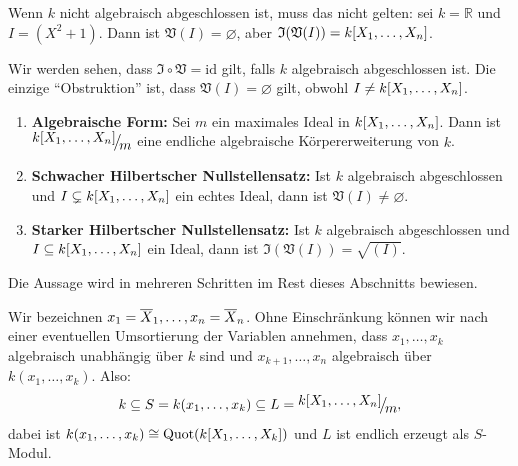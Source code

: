 \documentclass[a4paper,12pt]{scrbook}
\theoremstyle{blah}
\theoremstyle{stz}
\def\V{\mathfrak{V}}
\def\I{\mathfrak{I}}
\newcommand{\id}{\mathrm{id}}
\newcommand{\leer}{\ensuremath{\varnothing}}
\newcommand{\Quot}{\mathrm{Quot}}
\newcommand{\set}[1]{\ensuremath{\mathbb{#1}}}
\newcommand{\R}{\set{R}}
\def\Bar#1{\ensuremath\overline{#1}}
\newcommand{\Quotient}[2]{
  \raisebox{0.7ex}{\ensuremath{#1}}
  \ensuremath{\mkern-3mu}\big/\ensuremath{\mkern-3mu}
  \raisebox{-0.6ex}{\ensuremath{#2}}}
\newcommand{\polyx}[1][n]{\ensuremath%
  [X_{1},\dotsc,X_{#1}]}
\begin{document}
\begin{bsp*}
  Wenn $k$ nicht algebraisch abgeschlossen ist, muss das nicht gelten: sei $k=\R$ und $I=(X^2+1)$. Dann ist $\V(I)=\leer$, aber
  $\I(\V(I)) = k\polyx$.
\end{bsp*}

Wir werden sehen, dass $\I\circ\V=\id$ gilt, falls $k$ algebraisch abgeschlossen ist. Die einzige \enquote{Obstruktion} ist,
dass $\V(I)=\leer$ gilt, obwohl $I\neq k\polyx$.

\begin{satz}\label{satz2}\label{HNS}
  \begin{enumerate}
  \item {\bf Algebraische Form:}\label{satz2a} Sei $m$ ein maximales Ideal in $k\polyx$. Dann ist $\Quotient{k\polyx}{m}$ eine
    endliche algebraische Körpererweiterung von $k$.
  \item {\bf Schwacher Hilbertscher Nullstellensatz:}\label{satz2b} Ist $k$ algebraisch abgeschlossen und $I\subsetneq k\polyx$
    ein echtes Ideal, dann ist $\V(I)\neq\leer$.
  \item {\bf Starker Hilbertscher Nullstellensatz:}\label{satz2c} Ist $k$ algebraisch abgeschlossen und $I\subseteq k\polyx$ ein
    Ideal, dann ist $\I(\V(I))=\sqrt{(I)}$.
  \end{enumerate}
\end{satz}

Die Aussage wird in mehreren Schritten im Rest dieses Abschnitts bewiesen.

Wir bezeichnen $x_1=\Bar{X}_1,\dotsc,x_n=\Bar{X}_n$. Ohne Einschränkung können wir nach einer eventuellen Umsortierung
der Variablen annehmen, dass $x_1,\dotsc,x_k$ algebraisch unabhängig über $k$ sind und $x_{k+1},\dotsc,x_n$ algebraisch über
$k(x_1,\dotsc,x_k)$. Also:
\[ k \subseteq S = k(x_1,\dotsc,x_k) \subseteq L=\Quotient{k\polyx}{m}, \]
dabei ist $k(x_1,\dotsc,x_k)\cong\Quot(k\polyx[k])$ und $L$ ist endlich erzeugt als $S$-Modul.
\end{document}
